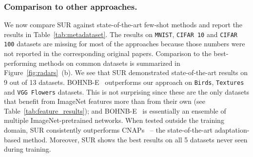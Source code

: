 \documentclass[runningheads]{llncs}
\begin{document}
\subsubsection{Comparison to other approaches.} We now compare SUR against
state-of-the-art few-shot methods and report the results in
Table~\ref{tab:metadataset}. The results on \texttt{MNIST},
\texttt{CIFAR 10} and \texttt{CIFAR 100} datasets are missing for most of the
approaches because those numbers were not reported in the corresponding original
papers.
Comparison to the best-performing methods on common datasets is summarized
in Figure~\ref{fig:radars}~(b). We see that SUR
demonstrated state-of-the-art results on 9 out of 13 datasets.
BOHNB-E~\cite{saikia2020optimized} outperforms our approach on \texttt{Birds},
\texttt{Textures} and \texttt{VGG Flowers} datasets. This is not surprising
since these are the only datasets that benefit from ImageNet features more than
from their own (see Table~\ref{tab:feature_results}); and
BOHNB-E~\cite{saikia2020optimized} is essentially an ensemble of multiple
ImageNet-pretrained networks.
When tested outside the training domain, SUR consistently outperforms
CNAPs~\cite{requeima2019fast} -- the state-of-the-art adaptation-based method.
Moreover, SUR shows the best results on all 5 datasets never seen during
training.
\end{document}
